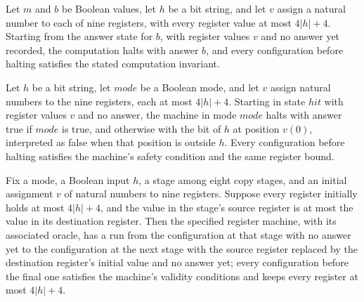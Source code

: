 \begin{lemma}
\label{Complexity.drop_ret}
\leanok
{}
Let $m$ and $b$ be Boolean values, let $h$ be a bit string, and let $v$ assign a natural
number to each of nine registers, with every register value at most $4|h|+4$. Starting
from the answer state for $b$, with register values $v$ and no answer yet recorded, the
computation halts with answer $b$, and every configuration before halting satisfies the
stated computation invariant.
\end{lemma}

\begin{lemma}
\label{Complexity.drop_hit}
\leanok
{}
Let $h$ be a bit string, let $mode$ be a Boolean mode, and let $v$ assign natural
numbers to the nine registers, each at most $4|h|+4$. Starting in state $hit$ with
register values $v$ and no answer, the machine in mode $mode$ halts with answer true if
$mode$ is true, and otherwise with the bit of $h$ at position $v(0)$, interpreted as
false when that position is outside $h$. Every configuration before halting satisfies
the machine's safety condition and the same register bound.
\end{lemma}

\begin{lemma}
\label{Complexity.drop_copy_run}
\leanok
{}
Fix a mode, a Boolean input $h$, a stage among eight copy stages, and an initial
assignment $v$ of natural numbers to nine registers. Suppose every register initially
holds at most $4|h|+4$, and the value in the stage's source register is at most the
value in its destination register. Then the specified register machine, with its
associated oracle, has a run from the configuration at that stage with no answer yet to
the configuration at the next stage with the source register replaced by the destination
register's initial value and no answer yet; every configuration before the final one
satisfies the machine's validity conditions and keeps every register at most $4|h|+4$.
\end{lemma}

